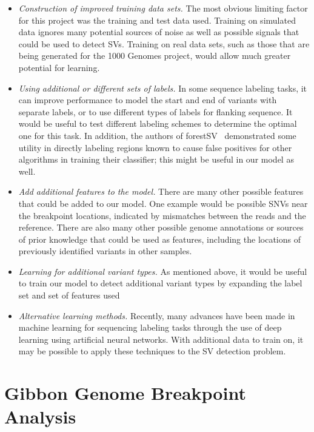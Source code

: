 \begin{itemize}
\item \emph{Construction of improved training data sets.} The most obvious limiting factor for this project was the training and test data used. Training on simulated data ignores many potential sources of noise as well as possible signals that could be used to detect SVs. Training on real data sets, such as those that are being generated for the 1000 Genomes project, would allow much greater potential for learning.
\item \emph{Using additional or different sets of labels.} In some sequence labeling tasks, it can improve performance to model the start and end of variants with separate labels, or to use different types of labels for flanking sequence. It would be useful to test different labeling schemes to determine the optimal one for this task. In addition, the authors of forestSV~\cite{Michaelson:2012fj} demonstrated some utility in directly labeling regions known to cause false positives for other algorithms in training their classifier; this might be useful in our model as well.
\item \emph{Add additional features to the model.} There are many other possible features that could be added to our model. One example would be possible SNVs near the breakpoint locations, indicated by mismatches between the reads and the reference. There are also many other possible genome annotations or sources of prior knowledge that could be used as features, including the locations of previously identified variants in other samples. 
\item \emph{Learning for additional variant types.} As mentioned above, it would be useful to train our model to detect additional variant types by expanding the label set and set of features used
\item \emph{Alternative learning methods.} Recently, many advances have been made in machine learning for sequencing labeling tasks through the use of deep learning using artificial neural networks. With additional data to train on, it may be possible to apply these techniques to the SV detection problem.
\end{itemize}

\section{Gibbon Genome Breakpoint Analysis}


